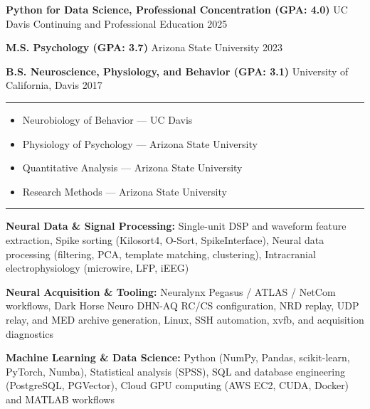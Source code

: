 \documentclass[11pt]{article}
\providecommand{\tightlist}{\setlength{\itemsep}{0pt}\setlength{\parskip}{0pt}}
\renewcommand{\subsection}[1]{\par\medskip\noindent{\sffamily\bfseries\fontsize{11pt}{0}\selectfont #1}\par\smallskip}
\begin{document}
\textbf{Python for Data Science, Professional Concentration (GPA: 4.0)}
\textbar{} UC Davis Continuing and Professional Education \textbar{}
2025

\textbf{M.S. Psychology (GPA: 3.7)} \textbar{} Arizona State University
\textbar{} 2023

\textbf{B.S. Neuroscience, Physiology, and Behavior (GPA: 3.1)}
\textbar{} University of California, Davis \textbar{} 2017

\begin{center}\rule{0.5\linewidth}{0.5pt}\end{center}

\subsection{Relevant Coursework}\label{relevant-coursework}

\begin{itemize}
\tightlist
\item
  Neurobiology of Behavior --- UC Davis
\item
  Physiology of Psychology --- Arizona State University
\item
  Quantitative Analysis --- Arizona State University
\item
  Research Methods --- Arizona State University
\end{itemize}

\begin{center}\rule{0.5\linewidth}{0.5pt}\end{center}

\subsection{Skills}\label{skills-1}

\textbf{Neural Data \& Signal Processing:} Single-unit DSP and waveform
feature extraction, Spike sorting (Kilosort4, O-Sort, SpikeInterface),
Neural data processing (filtering, PCA, template matching, clustering),
Intracranial electrophysiology (microwire, LFP, iEEG)

\textbf{Neural Acquisition \& Tooling:} Neuralynx Pegasus / ATLAS /
NetCom workflows, Dark Horse Neuro DHN-AQ RC/CS configuration, NRD
replay, UDP relay, and MED archive generation, Linux, SSH automation,
xvfb, and acquisition diagnostics

\textbf{Machine Learning \& Data Science:} Python (NumPy, Pandas,
scikit-learn, PyTorch, Numba), Statistical analysis (SPSS), SQL and
database engineering (PostgreSQL, PGVector), Cloud GPU computing (AWS
EC2, CUDA, Docker) and MATLAB workflows
\end{document}
